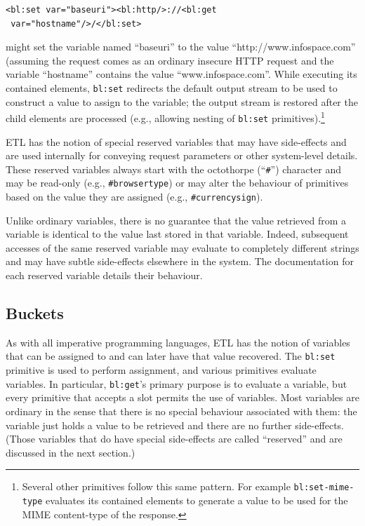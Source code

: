 \documentclass{www2003-submission}
\newcommand{\B}{\discretionary{}{}{}}
\newcommand{\smtexttt}[1]{{\small\texttt{#1}}}
\begin{document}
\begin{verbatim}
<bl:set var="baseuri"><bl:http/>://<bl:get
 var="hostname"/>/</bl:set>
\end{verbatim}

\noindent might set the variable named ``baseuri'' to the value
``http://www.\B{}infospace.\B{}com'' (assuming the request comes as an
ordinary insecure HTTP request and the variable ``hostname'' contains
the value ``www.infospace.com''.  While executing its contained
elements, \smtexttt{bl:set} redirects the default output stream to be
used to construct a value to assign to the variable; the output stream
is restored after the child elements are processed (e.g., allowing
nesting of \smtexttt{bl:set} primitives).\footnote{Several other
primitives follow this same pattern.  For example
\smtexttt{bl:set-mime-type} evaluates its contained elements to
generate a value to be used for the MIME content-type of the
response.}

ETL has the notion of special reserved variables that may have
side-effects and are used internally for conveying request parameters or
other system-level details.  These reserved variables always start with
the octothorpe (``\smtexttt{\#}'') character and may be read-only (e.g.,
\smtexttt{\#browsertype}) or may alter the behaviour of primitives based
on the value they are assigned (e.g., \smtexttt{\#currencysign}).  

Unlike ordinary variables, there is no guarantee that the value
retrieved from a variable is identical to the value last stored in that
variable.  Indeed, subsequent accesses of the same reserved
variable may evaluate to completely different strings and may have
subtle side-effects elsewhere in the system.  The documentation for each
reserved variable details their behaviour.

\subsection{Buckets}
\label{ssec-buckets}

As with all imperative programming languages, ETL has the notion of
variables that can be assigned to and can later have that value
recovered.  The \smtexttt{bl:set} primitive is used to perform
assignment, and various primitives evaluate variables. In particular,
\smtexttt{bl:get}'s primary purpose is to evaluate a variable, but
every primitive that accepts a slot permits the use of variables.  Most
variables are ordinary in the sense that there is no special behaviour
associated with them: the variable just holds a value to be retrieved and
there are no further side-effects.  (Those variables that do have special
side-effects are called ``reserved'' and are discussed in the next
section.)
\end{document}

